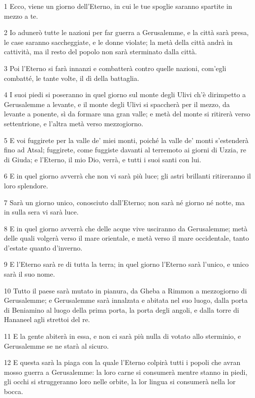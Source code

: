 \par 1 Ecco, viene un giorno dell'Eterno, in cui le tue spoglie saranno spartite in mezzo a te.
\par 2 Io adunerò tutte le nazioni per far guerra a Gerusalemme, e la città sarà presa, le case saranno saccheggiate, e le donne violate; la metà della città andrà in cattività, ma il resto del popolo non sarà sterminato dalla città.
\par 3 Poi l'Eterno si farà innanzi e combatterà contro quelle nazioni, com'egli combatté, le tante volte, il dì della battaglia.
\par 4 I suoi piedi si poseranno in quel giorno sul monte degli Ulivi ch'è dirimpetto a Gerusalemme a levante, e il monte degli Ulivi si spaccherà per il mezzo, da levante a ponente, sì da formare una gran valle; e metà del monte si ritirerà verso settentrione, e l'altra metà verso mezzogiorno.
\par 5 E voi fuggirete per la valle de' miei monti, poiché la valle de' monti s'estenderà fino ad Atsal; fuggirete, come fuggiste davanti al terremoto ai giorni di Uzzia, re di Giuda; e l'Eterno, il mio Dio, verrà, e tutti i suoi santi con lui.
\par 6 E in quel giorno avverrà che non vi sarà più luce; gli astri brillanti ritireranno il loro splendore.
\par 7 Sarà un giorno unico, conosciuto dall'Eterno; non sarà né giorno né notte, ma in sulla sera vi sarà luce.
\par 8 E in quel giorno avverrà che delle acque vive usciranno da Gerusalemme; metà delle quali volgerà verso il mare orientale, e metà verso il mare occidentale, tanto d'estate quanto d'inverno.
\par 9 E l'Eterno sarà re di tutta la terra; in quel giorno l'Eterno sarà l'unico, e unico sarà il suo nome.
\par 10 Tutto il paese sarà mutato in pianura, da Gheba a Rimmon a mezzogiorno di Gerusalemme; e Gerusalemme sarà innalzata e abitata nel suo luogo, dalla porta di Beniamino al luogo della prima porta, la porta degli angoli, e dalla torre di Hananeel agli strettoi del re.
\par 11 E la gente abiterà in essa, e non ci sarà più nulla di votato allo sterminio, e Gerusalemme se ne starà al sicuro.
\par 12 E questa sarà la piaga con la quale l'Eterno colpirà tutti i popoli che avran mosso guerra a Gerusalemme: la loro carne si consumerà mentre stanno in piedi, gli occhi si struggeranno loro nelle orbite, la lor lingua si consumerà nella lor bocca.

